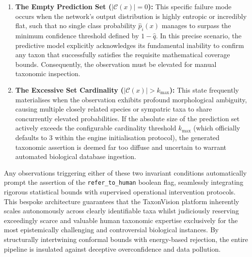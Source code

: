 \begin{enumerate}[label=\textbf{\arabic*.}]
    \item \textbf{The Empty Prediction Set ($\vert\mathcal{C}(x)\vert = 0$):} This specific failure mode occurs when the network's output distribution is highly entropic or incredibly flat, such that no single class probability $\hat{p}_i(x)$ manages to surpass the minimum confidence threshold defined by $1 - \hat{q}$. In this precise scenario, the predictive model explicitly acknowledges its fundamental inability to confirm any taxon that successfully satisfies the requisite mathematical coverage bounds. Consequently, the observation must be elevated for manual taxonomic inspection.
    \item \textbf{The Excessive Set Cardinality ($\vert\mathcal{C}(x)\vert > k_{\text{max}}$):} This state frequently materialises when the observation exhibits profound morphological ambiguity, causing multiple closely related species or sympatric taxa to share concurrently elevated probabilities. If the absolute size of the prediction set actively exceeds the configurable cardinality threshold $k_{\text{max}}$ (which officially defaults to 3 within the engine initialisation protocol), the generated taxonomic assertion is deemed far too diffuse and uncertain to warrant automated biological database ingestion.
\end{enumerate}

Any observations triggering either of these two invariant conditions automatically prompt the assertion of the \texttt{refer\_to\_human} boolean flag, seamlessly integrating rigorous statistical bounds with supervised operational intervention protocols. This bespoke architecture guarantees that the TaxonVision platform inherently scales autonomously across clearly identifiable taxa whilst judiciously reserving exceedingly scarce and valuable human taxonomic expertise exclusively for the most epistemically challenging and controversial biological instances. By structurally intertwining conformal bounds with energy-based rejection, the entire pipeline is insulated against deceptive overconfidence and data pollution.
